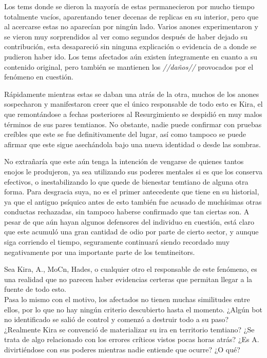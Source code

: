 \documentclass[
  spanish,
]{book}
\begin{document}
Los tems donde se dieron la mayoría de estas permanecieron por mucho tiempo totalmente vacíos, aparentando tener decenas de replicas en su interior, pero que al acercarse estas no aparecían por ningún lado. Varios anones experimentaron y se vieron muy sorprendidos al ver como segundos después de haber dejado su contribución, esta desapareció sin ninguna explicación o evidencia de a donde se pudieron haber ido. Los tems afectados aún existen íntegramente en cuanto a su contenido original, pero también se mantienen los \emph{//daños//} provocados por el fenómeno en cuestión.

Rápidamente mientras estas se daban una atrás de la otra, muchos de los anones sospecharon y manifestaron creer que el único responsable de todo esto es Kira, el que remontándose a fechas posteriores al Resurgimiento se despidió en muy malos términos de sus pares temtianos. No obstante, nadie puede confirmar con pruebas creíbles que este se fue definitivamente del lugar, así como tampoco se puede afirmar que este sigue asechándola bajo una nueva identidad o desde las sombras.

No extrañaría que este aún tenga la intención de vengarse de quienes tantos enojos le produjeron, ya sea utilizando sus poderes mentales si es que los conserva efectivos, o inestabilizando lo que quede de bienestar temtiano de alguna otra forma. Para desgracia suya, no es el primer antecedente que tiene en su historial, ya que el antiguo psíquico antes de esto también fue acusado de muchísimas otras conductas rechazadas, sin tampoco haberse confirmado que tan ciertas son. A pesar de que aún hayan algunos defensores del individuo en cuestión, está claro que este acumuló una gran cantidad de odio por parte de cierto sector, y aunque siga corriendo el tiempo, seguramente continuará siendo recordado muy negativamente por una importante parte de los temtineitors.

Sea Kira, A., MoCn, Hades, o cualquier otro el responsable de este fenómeno, es una realidad que no parecen haber evidencias certeras que permitan llegar a la fuente de todo esto.\\
Pasa lo mismo con el motivo, los afectados no tienen muchas similitudes entre ellos, por lo que no hay ningún criterio descubierto hasta el momento. ¿Algún bot no identificado se salió de control y comenzó a destruir todo a su paso? ¿Realmente Kira se convenció de materializar su ira en territorio temtiano? ¿Se trata de algo relacionado con los errores críticos vistos pocas horas atrás? ¿Es A. divirtiéndose con sus poderes mientras nadie entiende que ocurre? ¿O qué?
\end{document}
